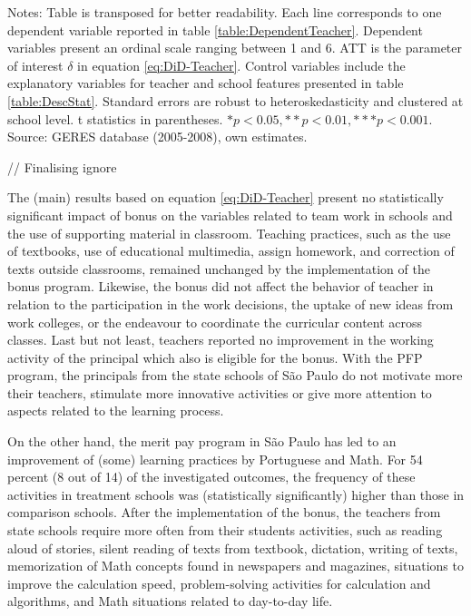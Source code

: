 \documentclass[a4paper, 12pt]{article}
\begin{document}
{\begin{minipage}{1\textwidth}            \scriptsize Notes: Table is transposed for better readability. Each line corresponds to one dependent variable reported in table \ref{table:DependentTeacher}. Dependent variables present an ordinal scale ranging between 1 and 6. ATT is the parameter of interest $\delta$ in equation \eqref{eq:DiD-Teacher}. Control variables include the explanatory variables for teacher and school features presented in table \ref{table:DescStat}. Standard errors are robust to heteroskedasticity and clustered at school level. t statistics in parentheses. \( * p<0.05, ** p<0.01, *** p<0.001 \).\\                    
Source: GERES database (2005-2008), own estimates.            
\end{minipage}                         

// Finalising ignore
} 

\justify


The (main) results based on equation \eqref{eq:DiD-Teacher} present no statistically significant impact of bonus on the variables related to team work in schools and the use of supporting material in classroom. Teaching practices, such as the use of textbooks, use of educational multimedia, assign homework, and correction of texts outside classrooms, remained unchanged by the implementation of the bonus program. Likewise, the bonus did not affect the behavior of teacher in relation to the participation in the work decisions, the uptake of new ideas from work colleges, or the endeavour to coordinate the curricular content across classes. Last but not least, teachers reported no improvement in the working activity of the principal \textemdash which also is eligible for the bonus. With the PFP program, the principals from the state schools of São Paulo do not motivate more their teachers, stimulate more innovative activities or give more attention to aspects related to the learning process.

On the other hand, the merit pay program in São Paulo has led to an improvement of (some) learning practices by Portuguese and Math. For 54 percent (8 out of 14) of the investigated outcomes, the frequency of these activities in treatment schools was (statistically significantly) higher than those in comparison schools. After the implementation of the bonus, the teachers from state schools require more often from their students activities, such as reading aloud of stories, silent reading of texts from textbook, dictation, writing of texts, memorization of Math concepts found in newspapers and magazines, situations to improve the calculation speed, problem-solving activities for calculation and algorithms, and Math situations related to day-to-day life.
\end{document}
